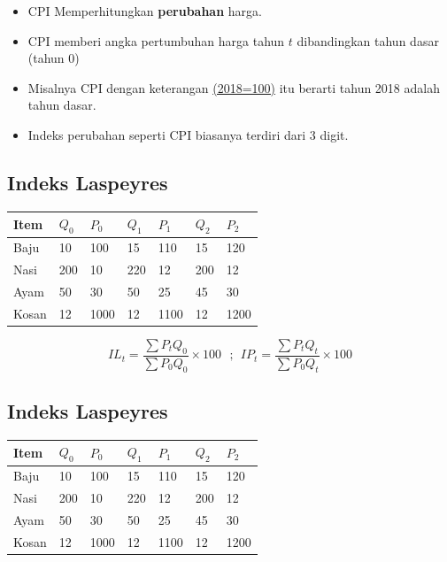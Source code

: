 \documentclass[
  letterpaper,
  DIV=11,
  numbers=noendperiod]{scrartcl}
\begin{document}
\begin{itemize}
\item
  CPI Memperhitungkan \textbf{perubahan} harga.
\item
  CPI memberi angka pertumbuhan harga tahun \(t\) dibandingkan tahun
  dasar (tahun 0)
\item
  Misalnya CPI dengan keterangan
  \href{https://www.bps.go.id/id/statistics-table/2/MTcwOSMy/indeks-harga-konsumen-90-kota--umum-.html}{(2018=100)}
  itu berarti tahun 2018 adalah tahun dasar.
\item
  Indeks perubahan seperti CPI biasanya terdiri dari 3 digit.
\end{itemize}

\hypertarget{indeks-laspeyres}{%
\subsection{Indeks Laspeyres}\label{indeks-laspeyres}}

\begin{longtable}[]{@{}lllllll@{}}
\toprule\noalign{}
Item & \(Q_0\) & \(P_0\) & \(Q_1\) & \(P_1\) & \(Q_2\) & \(P_2\) \\
\midrule\noalign{}
\endhead
\bottomrule\noalign{}
\endlastfoot
Baju & 10 & 100 & 15 & 110 & 15 & 120 \\
Nasi & 200 & 10 & 220 & 12 & 200 & 12 \\
Ayam & 50 & 30 & 50 & 25 & 45 & 30 \\
Kosan & 12 & 1000 & 12 & 1100 & 12 & 1200 \\
\end{longtable}

\[
IL_t=\frac{\sum P_t Q_0}{\sum P_0 Q_0} \times 100 \ \ \ ; \ \ IP_t=\frac{\sum P_t Q_t}{\sum P_0 Q_t} \times 100
\]

\hypertarget{indeks-laspeyres-1}{%
\subsection{Indeks Laspeyres}\label{indeks-laspeyres-1}}

\begin{longtable}[]{@{}lllllll@{}}
\toprule\noalign{}
Item & \(Q_0\) & \(P_0\) & \(Q_1\) & \(P_1\) & \(Q_2\) & \(P_2\) \\
\midrule\noalign{}
\endhead
\bottomrule\noalign{}
\endlastfoot
Baju & 10 & 100 & 15 & 110 & 15 & 120 \\
Nasi & 200 & 10 & 220 & 12 & 200 & 12 \\
Ayam & 50 & 30 & 50 & 25 & 45 & 30 \\
Kosan & 12 & 1000 & 12 & 1100 & 12 & 1200 \\
\end{longtable}
\end{document}
